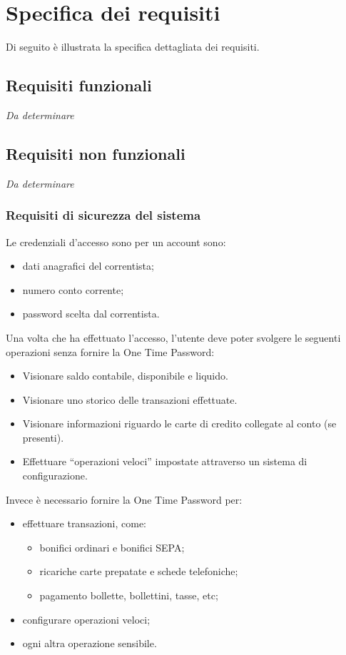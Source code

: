 
\section{Specifica dei requisiti}

Di seguito \`e illustrata la specifica dettagliata dei requisiti.

\subsection{Requisiti funzionali}

\emph{Da determinare}

\subsection{Requisiti non funzionali}

\emph{Da determinare}

\subsubsection{Requisiti di sicurezza del sistema}
 
Le credenziali d'accesso sono per un account sono:
\begin{itemize}
	\item dati anagrafici del correntista;
	\item numero conto corrente;
	\item password scelta dal correntista.
\end{itemize}
	
Una volta che ha effettuato l'accesso,  l'utente deve poter svolgere le seguenti operazioni senza fornire la One Time Password:
\begin{itemize}
	\item Visionare saldo contabile, disponibile e liquido.
	\item Visionare uno storico delle transazioni effettuate.
	\item Visionare informazioni riguardo le carte di credito collegate al conto (se presenti).
	\item Effettuare ``operazioni veloci'' impostate attraverso un sistema di configurazione.
\end{itemize}

Invece è necessario fornire la One Time Password per:
\begin{itemize}
	\item effettuare transazioni, come:
	\begin{itemize}
		\item bonifici ordinari e bonifici SEPA;
		\item ricariche carte prepatate e schede telefoniche;
		\item pagamento bollette, bollettini, tasse, etc;
	\end{itemize}
	\item configurare operazioni veloci;
	\item ogni altra operazione sensibile.
\end{itemize}

